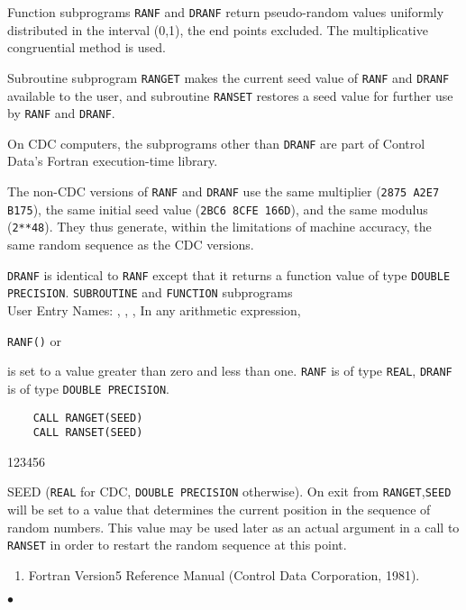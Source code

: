                       
             
 
       
\begin{center}
\end{center}
Function subprograms {\tt RANF} and {\tt DRANF} return pseudo-random
values uniformly distributed in the interval (0,1), the end points
excluded. The multiplicative congruential method is used.
\par
Subroutine subprogram {\tt RANGET} makes the current seed value of
{\tt RANF} and {\tt DRANF} available to the user, and subroutine
{\tt RANSET} restores a seed  value for further use by {\tt RANF} and
{\tt DRANF}.
\par
On CDC computers, the subprograms other than {\tt DRANF}
are part of Control Data's Fortran execution-time library.
 
The non-CDC versions of {\tt RANF} and {\tt DRANF} use the same
multiplier ({\tt 2875 A2E7 B175}), the same initial seed value
({\tt 2BC6 8CFE 166D}), and the same modulus ({\tt 2**48}).
They thus generate,
within the limitations of machine accuracy, the same random
sequence as the CDC versions.
\par
{\tt DRANF} is identical to {\tt RANF} except that it returns a function
value of type {\tt DOUBLE PRECISION}.
\Structure
{\tt SUBROUTINE} and {\tt FUNCTION} subprograms \\
User Entry Names: , , ,
\Usage
In any arithmetic expression,
\begin{center}
{\tt RANF()} \qquad or 
\end{center}
is set to a value greater than zero and less than one. {\tt RANF}
is of type {\tt REAL}, {\tt DRANF} is of type {\tt DOUBLE PRECISION}.
\begin{verbatim}
    CALL RANGET(SEED)
    CALL RANSET(SEED)
\end{verbatim}
\begin{DLtt}{123456}
\item[SEED] ({\tt REAL} for CDC, {\tt DOUBLE PRECISION} otherwise).
On exit from {\tt RANGET},{\tt SEED} will be set to a value that
determines the current position in the sequence of random numbers.
This value may be used later as an actual argument in a call to
{\tt RANSET} in order to restart the random sequence at this point.
\end{DLtt}
\Refer
\begin{enumerate}
\item Fortran Version5 Reference Manual (Control Data
Corporation, 1981).
\end{enumerate}
$\bullet$
